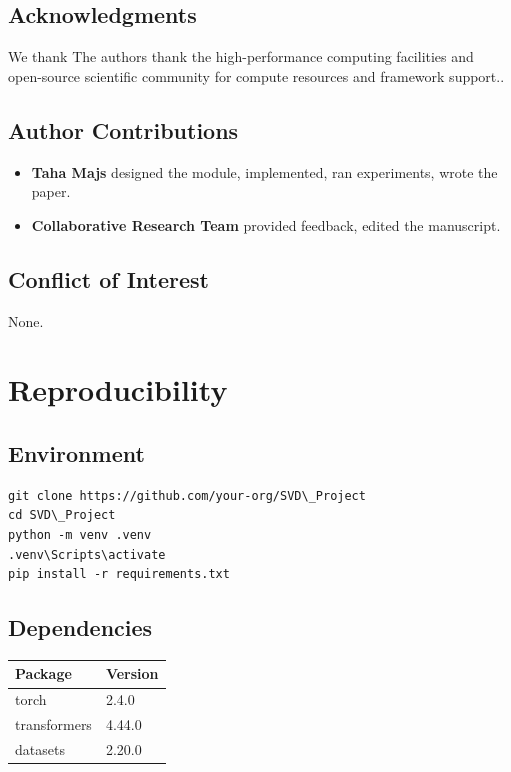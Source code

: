 \subsection{Acknowledgments}

We thank The authors thank the high-performance computing facilities and open-source scientific community for compute resources and framework support..

\subsection{Author Contributions}

\begin{itemize}
\item \textbf{Taha Majs} designed the module, implemented, ran experiments, wrote
  the paper.
\item \textbf{Collaborative Research Team} provided feedback, edited the manuscript.

\end{itemize}
\subsection{Conflict of Interest}

None.



\section{Reproducibility}

\subsection{Environment}

\begin{lstlisting}
git clone https://github.com/your-org/SVD\_Project
cd SVD\_Project
python -m venv .venv
.venv\Scripts\activate
pip install -r requirements.txt
\end{lstlisting}

\subsection{Dependencies}

\begin{table}[H]
\centering
\small
\begin{tabular}{ll}
\toprule
\textbf{Package} & \textbf{Version} \\
\midrule
torch & 2.4.0 \\
transformers & 4.44.0 \\
datasets & 2.20.0 \\
\bottomrule
\end{tabular}
\end{table}

